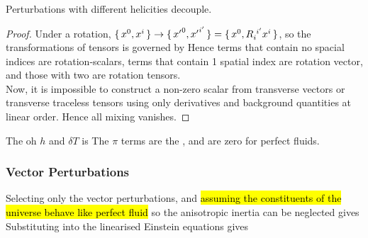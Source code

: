 \documentclass{article}
\begin{document}
\begin{theorem}
Perturbations with different helicities decouple.
\end{theorem}
\begin{proof}
Under a rotation, $\set{x^0,x^i} \to \set{{x^\prime}^0,{x^\prime}^{i^\prime}}=\set{x^0, R\indices{_i^{i^\prime}} x^i}$, so the transformations of tensors is governed by 
Hence terms that contain no spacial indices are rotation-scalars, terms that contain 1 spatial index are rotation vector, and those with two are rotation tensors. \\
Now, it is impossible to construct a non-zero scalar from transverse vectors or transverse traceless tensors using only derivatives and background quantities at linear order. Hence all mixing vanishes. 
\end{proof}

\begin{definition}
The  oh $h$ and $\delta T $ is 
The $\pi$ terms are the , and are zero for perfect fluids. 
\end{definition}



\subsubsection{Vector Perturbations}
Selecting only the vector perturbations, and \hl{assuming the constituents of the universe behave like perfect fluid} so the anisotropic inertia can be neglected gives 
Substituting into the linearised Einstein equations gives 
\end{document}
